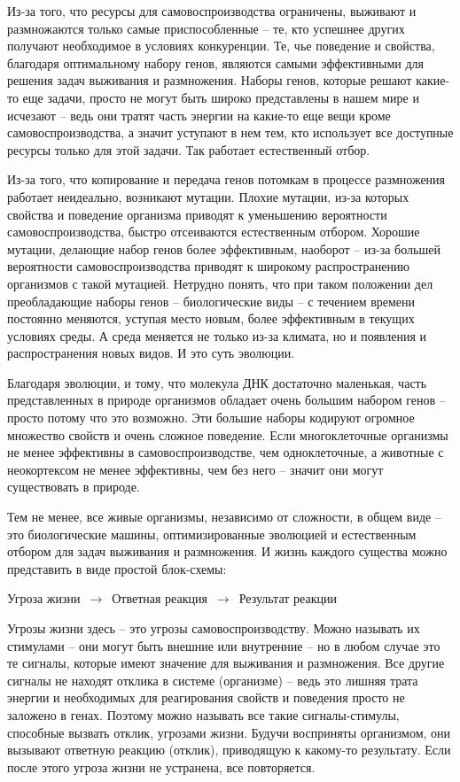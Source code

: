 \documentclass[12pt,a4paper]{report}
\begin{document}
\noindent Из-за того, что ресурсы для самовоспроизводства ограничены, выживают и размножаются только самые приспособленные -- те, кто успешнее других получают необходимое в условиях конкуренции. Те, чье поведение и свойства, благодаря оптимальному набору генов, являются самыми эффективными для решения задач выживания и размножения. Наборы генов, которые решают какие-то еще задачи, просто не могут быть широко представлены в нашем мире и исчезают -- ведь они тратят часть энергии на какие-то еще вещи кроме самовоспроизводства, а значит уступают в нем тем, кто использует все доступные ресурсы только для этой задачи. Так работает естественный отбор.

\noindent Из-за того, что копирование и передача генов потомкам в процессе размножения работает неидеально, возникают мутации. Плохие мутации, из-за которых свойства и поведение организма приводят к уменьшению вероятности самовоспроизводства, быстро отсеиваются естественным отбором. Хорошие мутации, делающие набор генов более эффективным, наоборот -- из-за большей вероятности самовоспроизводства приводят к широкому распространению организмов с такой мутацией. Нетрудно понять, что при таком положении дел преобладающие наборы генов -- биологические виды -- с течением времени постоянно меняются, уступая место новым, более эффективным в текущих условиях среды. А среда меняется не только из-за климата, но и появления и распространения новых видов. И это суть эволюции.

\noindent Благодаря эволюции, и тому, что молекула ДНК достаточно маленькая, часть представленных в природе организмов обладает очень большим набором генов -- просто потому что это возможно. Эти большие наборы кодируют огромное множество свойств и очень сложное поведение. Если многоклеточные организмы не менее эффективны в самовоспроизводстве, чем одноклеточные, а животные с неокортексом не менее эффективны, чем без него -- значит они могут существовать в природе.

\noindent Тем не менее, все живые организмы, независимо от сложности, в общем виде -- это биологические машины, оптимизированные эволюцией и естественным отбором для задач выживания и размножения. И жизнь каждого существа можно представить в виде простой блок-схемы:

\begin{center}
Угроза жизни $\,\to\,$ Ответная реакция $\,\to\,$ Результат реакции
\end{center}

\noindent Угрозы жизни здесь -- это угрозы самовоспроизводству. Можно называть их стимулами -- они могут быть внешние или внутренние -- но в любом случае это те сигналы, которые имеют значение для выживания и размножения. Все другие сигналы не находят отклика в системе (организме) -- ведь это лишняя трата энергии и необходимых для реагирования свойств и поведения просто не заложено в генах. Поэтому можно называть все такие сигналы-стимулы, способные вызвать отклик, угрозами жизни. Будучи восприняты организмом, они вызывают ответную реакцию (отклик), приводящую к какому-то результату. Если после этого угроза жизни не устранена, все повторяется.
\end{document}
